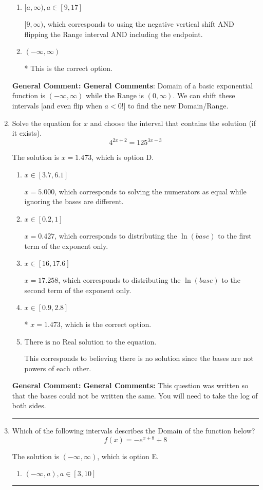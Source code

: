 \documentclass{extbook}[14pt]
\newcommand{\litem}[1]{\item #1

\rule{\textwidth}{0.4pt}}
\begin{document}
\begin{enumerate}
{\begin{enumerate}[label=\Alph*.]
$(-\infty, -9)$, which corresponds to using the correct vertical shift *if we wanted the Range*.
\item \( [a, \infty), a \in [9, 17] \)

$[9, \infty)$, which corresponds to using the negative vertical shift AND flipping the Range interval AND including the endpoint.
\item \( (-\infty, \infty) \)

* This is the correct option.
\end{enumerate}

\textbf{General Comment:} \textbf{General Comments}: Domain of a basic exponential function is $(-\infty, \infty)$ while the Range is $(0, \infty)$. We can shift these intervals [and even flip when $a<0$!] to find the new Domain/Range.
}
\litem{
Solve the equation for $x$ and choose the interval that contains the solution (if it exists).
\[ 4^{2x+2} = 125^{3x-3} \]

The solution is \( x = 1.473 \), which is option D.\begin{enumerate}[label=\Alph*.]
\item \( x \in [3.7, 6.1] \)

$x = 5.000$, which corresponds to solving the numerators as equal while ignoring the bases are different.
\item \( x \in [0.2, 1] \)

$x = 0.427$, which corresponds to distributing the $\ln(base)$ to the first term of the exponent only.
\item \( x \in [16, 17.6] \)

$x = 17.258$, which corresponds to distributing the $\ln(base)$ to the second term of the exponent only.
\item \( x \in [0.9, 2.8] \)

* $x = 1.473$, which is the correct option.
\item \( \text{There is no Real solution to the equation.} \)

This corresponds to believing there is no solution since the bases are not powers of each other.
\end{enumerate}

\textbf{General Comment:} \textbf{General Comments:} This question was written so that the bases could not be written the same. You will need to take the log of both sides.
}
\litem{
Which of the following intervals describes the Domain of the function below?
\[ f(x) = -e^{x+8}+8 \]

The solution is \( (-\infty, \infty) \), which is option E.\begin{enumerate}[label=\Alph*.]
\item \( (-\infty, a), a \in [3, 10] \)


\end{enumerate}}
\end{enumerate}
\end{document}

